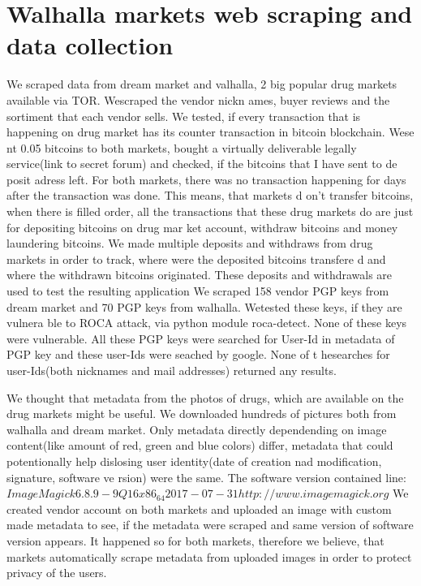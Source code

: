 \documentclass[
  digital, %
  table,   %
  lof,     %
  lot,     %
  oneside
]{fithesis3}
\begin{document}
\section{Walhalla markets web scraping and data collection}
We scraped data from dream market and valhalla, 2 big popular drug markets available via TOR. Wescraped the vendor nickn
ames, buyer reviews and the sortiment that each vendor sells.
We tested, if every transaction that is happening on drug market has its counter transaction in bitcoin blockchain. Wese
nt 0.05 bitcoins to both markets,
bought a virtually deliverable legally service(link to secret forum) and checked, if the bitcoins that I have sent to de
posit adress left.
For both markets, there was no transaction happening for days after the transaction was done. This means, that markets d
on't transfer bitcoins,
when there is filled order, all the transactions that these drug markets do are just for depositing bitcoins on drug mar
ket account,
withdraw bitcoins and money laundering bitcoins.
We made multiple deposits and withdraws from drug markets in order to track, where were the deposited bitcoins transfere
d and where the withdrawn bitcoins originated.
These deposits and withdrawals are used to test the resulting application
We scraped 158 vendor PGP keys from dream market and 70 PGP keys from walhalla. Wetested these keys, if they are vulnera
ble to ROCA attack, via python module roca-detect. None of these keys were vulnerable.
All these PGP keys were searched for User-Id in metadata of PGP key and these user-Ids were seached by google. None of t
hesearches for user-Ids(both nicknames and mail addresses) returned any results.

We thought that metadata from the photos of drugs, which are available on the drug markets might be useful.
We downloaded hundreds of pictures both from walhalla and dream market.
Only metadata directly dependending on image content(like amount of red, green and blue colors) differ,
metadata that could potentionally help dislosing user identity(date of creation nad modification, signature, software ve
rsion) were the same.
The software version contained line: $ImageMagick 6.8.9-9 Q16 x86_64 2017-07-31 http://www.imagemagick.org$
We created vendor account on both markets and uploaded an image with custom made metadata to see,
if the metadata were scraped and same version of software version appears. It happened so for both markets,
therefore we believe, that markets automatically scrape metadata from uploaded images in order to protect privacy of the
 users.
\end{document}
